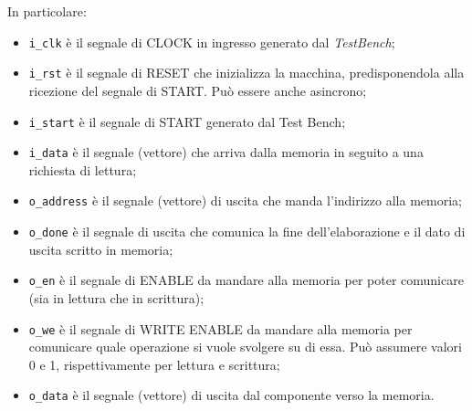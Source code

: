 \documentclass{article}
\begin{document}
In particolare:
\begin{itemize}
    \item   \texttt{i\_clk} è il segnale di CLOCK in ingresso generato dal \emph{TestBench};
    \item   \texttt{i\_rst} è il segnale di RESET che inizializza la macchina, predisponendola alla ricezione del segnale di START. Può essere anche asincrono;
    \item   \texttt{i\_start} è il segnale di START generato dal Test Bench;
    \item   \texttt{i\_data} è il segnale (vettore) che arriva dalla memoria in seguito a una richiesta di lettura;
    \item   \texttt{o\_address} è il segnale (vettore) di uscita che manda l’indirizzo alla memoria;
    \item   \texttt{o\_done} è il segnale di uscita che comunica la fine dell’elaborazione e il dato di uscita scritto in memoria;
    \item   \texttt{o\_en} è il segnale di ENABLE da mandare alla memoria per poter comunicare (sia in lettura che in scrittura);
    \item   \texttt{o\_we} è il segnale di WRITE ENABLE da mandare alla memoria per comunicare quale operazione si vuole svolgere su di essa. Può assumere valori 0 e 1, rispettivamente per lettura e scrittura;
    \item   \texttt{o\_data} è il segnale (vettore) di uscita dal componente verso la memoria.
\end{itemize}

\pagebreak
\end{document}
